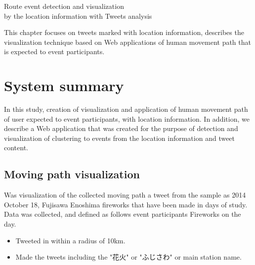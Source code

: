 \chapterhead
{Route event detection and visualization\\
by the location information with Tweets analysis}

{This chapter focuses on tweets marked with location information, describes the visualization technique based on Web applications of human movement path that is expected to event participants.}


\section{System summary}
In this study, creation of visualization and application of human movement path of user expected to event participants, with location information.
In addition, we describe a Web application that was created for the purpose of detection and visualization of clustering to events from the location information and tweet content.

\subsection{Moving path visualization}
Was visualization of the collected moving path a tweet from the sample as 2014 October 18, Fujisawa Enoshima fireworks \cite{webpage_fujisawa} that have been made in days of study.
Data was collected, and defined as follows event participants Fireworks on the day.
\begin{itemize}
    \item Tweeted in within a radius of 10km.
    \item Made the tweets including the "花火" or "ふじさわ" or main station name.
\end{itemize}

